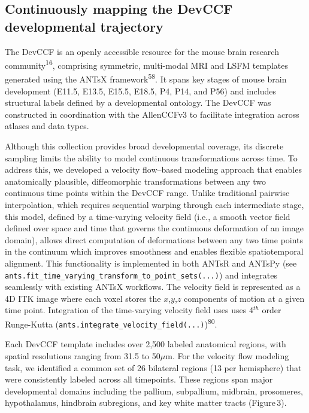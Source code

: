 \documentclass[
  12pt,
]{article}
\begin{document}
\subsection{Continuously mapping the DevCCF developmental
trajectory}\label{continuously-mapping-the-devccf-developmental-trajectory}

The DevCCF is an openly accessible resource for the mouse brain research
community\textsuperscript{16}, comprising symmetric, multi-modal MRI and
LSFM templates generated using the ANTsX framework\textsuperscript{58}.
It spans key stages of mouse brain development (E11.5, E13.5, E15.5,
E18.5, P4, P14, and P56) and includes structural labels defined by a
developmental ontology. The DevCCF was constructed in coordination with
the AllenCCFv3 to facilitate integration across atlases and data types.

Although this collection provides broad developmental coverage, its
discrete sampling limits the ability to model continuous transformations
across time. To address this, we developed a velocity flow--based
modeling approach that enables anatomically plausible, diffeomorphic
transformations between any two continuous time points within the DevCCF
range. Unlike traditional pairwise interpolation, which requires
sequential warping through each intermediate stage, this model, defined
by a time-varying velocity field (i.e., a smooth vector field defined
over space and time that governs the continuous deformation of an image
domain), allows direct computation of deformations between any two time
points in the continuum which improves smoothness and enables flexible
spatiotemporal alignment. This functionality is implemented in both
ANTsR and ANTsPy (see
\texttt{ants.fit\_time\_varying\_transform\_to\_point\_sets(...)}) and
integrates seamlessly with existing ANTsX workflows. The velocity field
is represented as a 4D ITK image where each voxel stores the
\(x\),\(y\),\(z\) components of motion at a given time point.
Integration of the time-varying velocity field uses uses 4\(^{th}\)
order Runge-Kutta
(\texttt{ants.integrate\_velocity\_field(...)})\textsuperscript{80}.

Each DevCCF template includes over 2,500 labeled anatomical regions,
with spatial resolutions ranging from 31.5 to 50\(\mu\)m. For the
velocity flow modeling task, we identified a common set of 26 bilateral
regions (13 per hemisphere) that were consistently labeled across all
timepoints. These regions span major developmental domains including the
pallium, subpallium, midbrain, prosomeres, hypothalamus, hindbrain
subregions, and key white matter tracts (Figure\,3).
\end{document}
